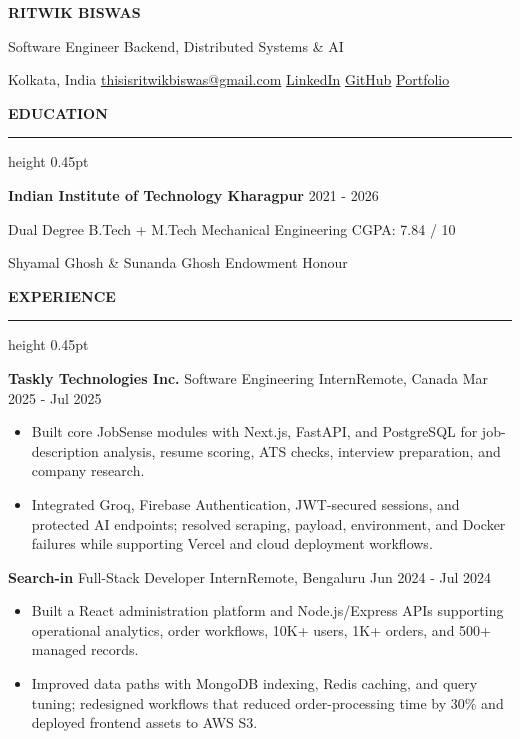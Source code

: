 \documentclass[10pt,a4paper]{article}
\newcommand{\resumesection}[1]{%
  \vspace{4.2pt}%
  {\color{accent}\fontsize{11.2pt}{12pt}\selectfont\bfseries\MakeUppercase{#1}}%
  \vspace{1.4pt}\par%
  {\color{rule}\hrule height 0.45pt}%
  \vspace{2.8pt}%
}
\newcommand{\entryline}[4]{%
  \textbf{#1} \textbar{} #2\hfill{\color{secondary}#3 \textbar{} #4}\par%
}
\newenvironment{resumeitems}{%
  \begin{itemize}[
    leftmargin=12pt,
    labelsep=4.2pt,
    itemsep=0.8pt,
    parsep=0pt,
    topsep=1.2pt,
    partopsep=0pt
  ]%
}{%
  \end{itemize}%
}
\begin{document}
\fontsize{9.75pt}{11.2pt}\selectfont

\begin{center}
  {\color{accent}\fontsize{23.5pt}{24.5pt}\selectfont\bfseries RITWIK BISWAS}\par
  \vspace{1.7pt}
  {\fontsize{11.3pt}{12pt}\selectfont Software Engineer \textbar{} Backend, Distributed Systems \& AI}\par
  \vspace{2.6pt}
  {\fontsize{9.2pt}{10.2pt}\selectfont
    Kolkata, India \textbar{}
    \href{mailto:thisisritwikbiswas@gmail.com}{thisisritwikbiswas@gmail.com} \textbar{}
    \href{https://www.linkedin.com/in/ritwik-biswas-958318234/}{LinkedIn} \textbar{}
    \href{https://github.com/rit2001}{GitHub} \textbar{}
    \href{https://ritwik-os.vercel.app/}{Portfolio}
  }
\end{center}
\vspace{-4.2pt}

\resumesection{Education}
\textbf{Indian Institute of Technology Kharagpur} \textbar{} {\color{secondary}2021 - 2026}\par
Dual Degree \textbar{} B.Tech + M.Tech \textbar{} Mechanical Engineering \textbar{} CGPA: 7.84 / 10\par
{\color{secondary}Shyamal Ghosh \& Sunanda Ghosh Endowment Honour}\par

\resumesection{Experience}
\entryline{Taskly Technologies Inc.}{Software Engineering Intern}{Remote, Canada}{Mar 2025 - Jul 2025}
\begin{resumeitems}
  \item Built core JobSense modules with Next.js, FastAPI, and PostgreSQL for job-description analysis, resume scoring, ATS checks, interview preparation, and company research.
  \item Integrated Groq, Firebase Authentication, JWT-secured sessions, and protected AI endpoints; resolved scraping, payload, environment, and Docker failures while supporting Vercel and cloud deployment workflows.
\end{resumeitems}

\entryline{Search-in}{Full-Stack Developer Intern}{Remote, Bengaluru}{Jun 2024 - Jul 2024}
\begin{resumeitems}
  \item Built a React administration platform and Node.js/Express APIs supporting operational analytics, order workflows, 10K+ users, 1K+ orders, and 500+ managed records.
  \item Improved data paths with MongoDB indexing, Redis caching, and query tuning; redesigned workflows that reduced order-processing time by 30\% and deployed frontend assets to AWS S3.
\end{resumeitems}
\end{document}
